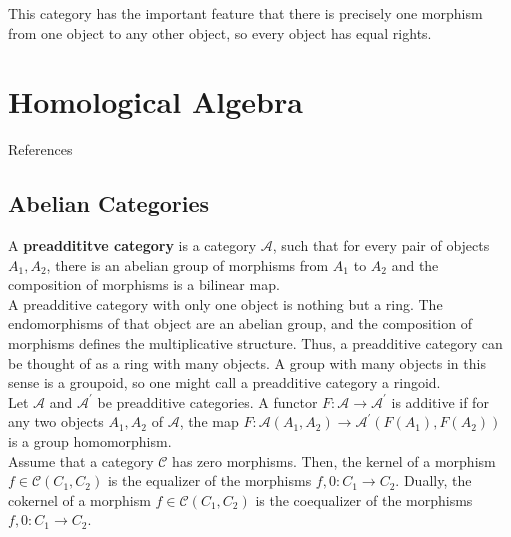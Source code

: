\begin{example}
\begin{example}
\begin{enumerate}
        This category has the important feature that there is precisely one morphism from one object to any other object, so every object has equal rights.

    \end{enumerate}
\end{example}










\chapter{Homological Algebra}

References \cite{richterCategoriesHomotopyTheory2020,weibelKbookIntroductionAlgebraic2013a}
\section{Abelian Categories}




A \textbf{preaddititve category} is a category $\mathcal{A}$, such that for every pair of objects $A_1, A_2$, there is an abelian group of morphisms from $A_1$ to $A_2$ and the composition of morphisms is a bilinear map.\\
A preadditive category with only one object is nothing but a ring. The endomorphisms of that object are an abelian group, and the composition of morphisms defines the multiplicative structure. Thus, a preadditive category can be thought of as a ring with many objects. A group with many objects in this sense is a groupoid, so one might call a preadditive category a ringoid.\\
Let $\mathcal{A}$ and $\mathcal{A}^{\prime}$ be preadditive categories. A functor $F: \mathcal{A} \rightarrow \mathcal{A}^{\prime}$ is additive if for any two objects $A_1, A_2$ of $\mathcal{A}$, the map $F: \mathcal{A}\left(A_1, A_2\right) \rightarrow \mathcal{A}^{\prime}\left(F\left(A_1\right), F\left(A_2\right)\right)$ is a group homomorphism.\\

Assume that a category $\mathcal{C}$ has zero morphisms. Then, the kernel of a morphism $f \in \mathcal{C}\left(C_1, C_2\right)$ is the equalizer of the morphisms $f, 0: C_1 \rightarrow C_2$. Dually, the cokernel of a morphism $f \in \mathcal{C}\left(C_1, C_2\right)$ is the coequalizer of the morphisms $f, 0: C_1 \rightarrow C_2$.


\end{example}
